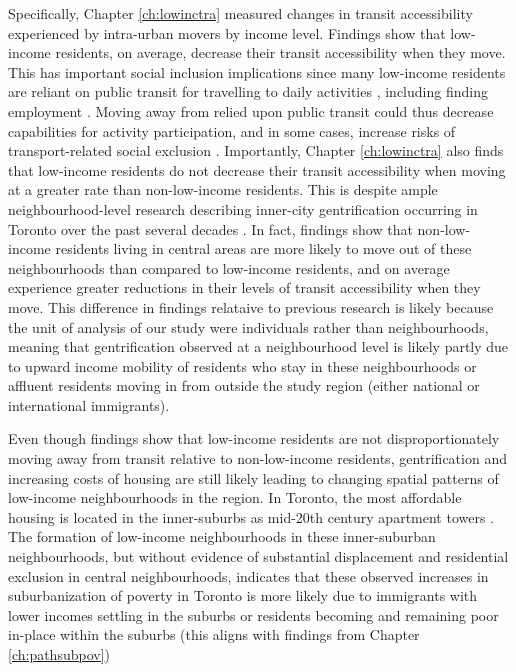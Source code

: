 Specifically, Chapter \ref{ch:lowinctra} measured changes in transit accessibility experienced by intra-urban movers by income level. Findings show that low-income residents, on average, decrease their transit accessibility when they move. This has important social inclusion implications since many low-income residents are reliant on public transit for travelling to daily activities \cite{allen_planning_2020,barri_can_2021}, including finding employment \cite{fransen_relationship_2019,bastiaanssen_does_2021}. Moving away from relied upon public transit could thus decrease capabilities for activity participation, and in some cases, increase risks of transport-related social exclusion \cite{lucas_transport_2012,allen_planning_2020}. Importantly, Chapter \ref{ch:lowinctra} also finds that low-income residents do not decrease their transit accessibility when moving at a greater rate than non-low-income residents. This is despite ample neighbourhood-level research describing inner-city gentrification occurring in Toronto over the past several decades \cite{hulchanski_three_2010,walks_gentrification_2021}. In fact, findings show that non-low-income residents living in central areas are more likely to move out of these neighbourhoods than compared to low-income residents, and on average experience greater reductions in their levels of transit accessibility when they move. This difference in findings relataive to previous research is likely because the unit of analysis of our study were individuals rather than neighbourhoods, meaning that gentrification observed at a neighbourhood level is likely partly due to upward income mobility of residents who stay in these neighbourhoods or affluent residents moving in from outside the study region (either national or international immigrants). 


Even though findings show that low-income residents are not disproportionately moving away from transit relative to non-low-income residents, gentrification and increasing costs of housing are still likely leading to changing spatial patterns of low-income neighbourhoods in the region. In Toronto, the most affordable housing is located in the inner-suburbs as mid-20th century apartment towers \cite{skaburskis_filtering_2014,august_gentrification_2018}. The formation of low-income neighbourhoods in these inner-suburban neighbourhoods, but without evidence of substantial displacement and residential exclusion in central neighbourhoods, indicates that these observed increases in suburbanization of poverty in Toronto is more likely due to immigrants with lower incomes settling in the suburbs or residents becoming and remaining poor in-place within the suburbs (this aligns with findings from Chapter \ref{ch:pathsubpov})

